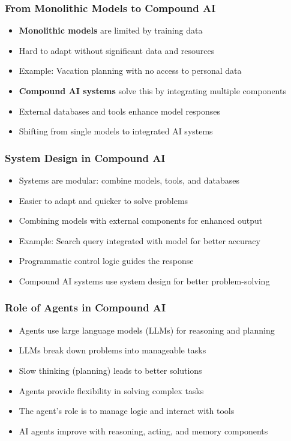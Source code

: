 \begin{frame}[fragile]\frametitle{From Monolithic Models to Compound AI}
\begin{itemize}
    \item \textbf{Monolithic models} are limited by training data
    \item Hard to adapt without significant data and resources
    \item Example: Vacation planning with no access to personal data
    \item \textbf{Compound AI systems} solve this by integrating multiple components
    \item External databases and tools enhance model responses
    \item Shifting from single models to integrated AI systems
\end{itemize}
\end{frame}

\begin{frame}[fragile]\frametitle{System Design in Compound AI}
\begin{itemize}
    \item Systems are modular: combine models, tools, and databases
    \item Easier to adapt and quicker to solve problems
    \item Combining models with external components for enhanced output
    \item Example: Search query integrated with model for better accuracy
    \item Programmatic control logic guides the response
    \item Compound AI systems use system design for better problem-solving
\end{itemize}
\end{frame}

\begin{frame}[fragile]\frametitle{Role of Agents in Compound AI}
\begin{itemize}
    \item Agents use large language models (LLMs) for reasoning and planning
    \item LLMs break down problems into manageable tasks
    \item Slow thinking (planning) leads to better solutions
    \item Agents provide flexibility in solving complex tasks
    \item The agent's role is to manage logic and interact with tools
    \item AI agents improve with reasoning, acting, and memory components
\end{itemize}
\end{frame}

